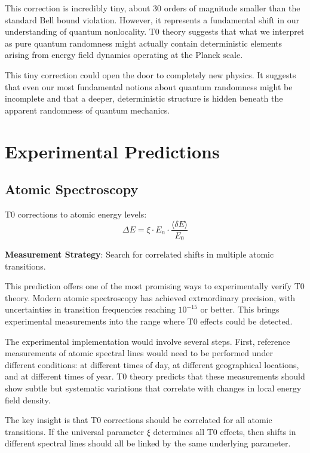 \documentclass[12pt,a4paper]{article}
\newcommand{\deltaE}{\delta E}
\newcommand{\xipar}{\xi}
\theoremstyle{definition}
\theoremstyle{remark}
\begin{document}
This correction is incredibly tiny, about 30 orders of magnitude smaller than the standard Bell bound violation. However, it represents a fundamental shift in our understanding of quantum nonlocality. T0 theory suggests that what we interpret as pure quantum randomness might actually contain deterministic elements arising from energy field dynamics operating at the Planck scale.

This tiny correction could open the door to completely new physics. It suggests that even our most fundamental notions about quantum randomness might be incomplete and that a deeper, deterministic structure is hidden beneath the apparent randomness of quantum mechanics.

\section{Experimental Predictions}

\subsection{Atomic Spectroscopy}

T0 corrections to atomic energy levels:
\begin{equation}
	\Delta E = \xipar \cdot E_n \cdot \frac{\langle \deltaE \rangle}{E_0}
	\label{eq:spectroscopic_shift}
\end{equation}

\textbf{Measurement Strategy}: Search for correlated shifts in multiple atomic transitions.

This prediction offers one of the most promising ways to experimentally verify T0 theory. Modern atomic spectroscopy has achieved extraordinary precision, with uncertainties in transition frequencies reaching $10^{-15}$ or better. This brings experimental measurements into the range where T0 effects could be detected.

The experimental implementation would involve several steps. First, reference measurements of atomic spectral lines would need to be performed under different conditions: at different times of day, at different geographical locations, and at different times of year. T0 theory predicts that these measurements should show subtle but systematic variations that correlate with changes in local energy field density.

The key insight is that T0 corrections should be correlated for all atomic transitions. If the universal parameter $\xipar$ determines all T0 effects, then shifts in different spectral lines should all be linked by the same underlying parameter.
\end{document}
